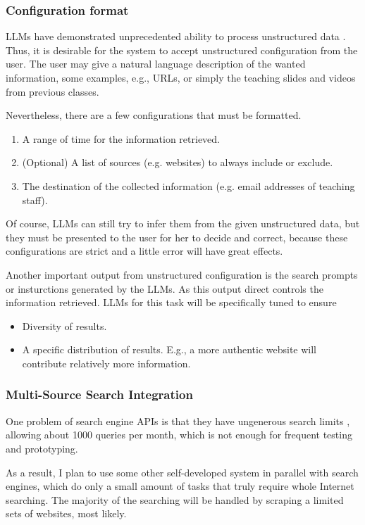 \documentclass[project-plan]{report-template}
\begin{document}
\subsubsection{Configuration format} 
LLMs have demonstrated unprecedented ability to process unstructured data
\cite{llm.unstructured.data.1, llm.unstructured.data.2}. Thus, it is desirable
for the system to accept unstructured configuration from the user. The user may
give a natural language description of the wanted information, some
examples, e.g., URLs, or simply the teaching slides and videos
from previous classes.

Nevertheless, there are a few configurations that must be formatted.
\begin{enumerate}
	\item A range of time for the information retrieved.
	\item (Optional) A list of sources (e.g. websites) to always include or exclude.
	\item The destination of the collected information (e.g. email addresses of
		teaching staff).
\end{enumerate}
Of course, LLMs can still try to infer them from the given unstructured data,
but they must be presented to the user for her to decide and correct, because
these configurations are strict and a little error will have great effects.

Another important output from unstructured configuration is the search prompts
or insturctions generated by the LLMs. As this output direct controls the
information retrieved. LLMs for this task will be specifically tuned to ensure
\begin{itemize}
	\item Diversity of results.
	\item A specific distribution of results. E.g., a more authentic website
		will contribute relatively more information.
\end{itemize}

\subsubsection{Multi-Source Search Integration} 
One problem of search engine APIs is that they have ungenerous search limits
\cite{search.api.limit.1}, allowing about 1000 queries per month, which is not
enough for frequent testing and prototyping.

As a result, I plan to use some other self-developed system in parallel with
search engines, which do only a small amount of tasks that truly require whole
Internet searching. The majority of the searching will be handled by scraping a
limited sets of websites, most likely.
\end{document}
